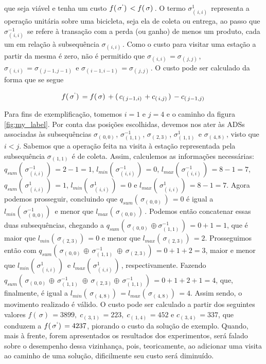 que seja viável e tenha um custo $f(\,\sigma^\lq)\, < f(\,\sigma)\,$. O termo $\sigma_{(\,i,i)\,}^1$ representa a operação unitária sobre uma bicicleta, seja ela de coleta ou entrega, ao passo que $\sigma^{-1}_{(\,i, i)\,}$ se refere à transação com a perda (ou ganho) de menos um produto, cada um em relação à subsequência $\sigma_{(\,i,i)\,}$. Como o custo para visitar uma estação a partir da mesma é zero, não é permitido que $\sigma_{(\,i,i)\,}=\sigma_{(\,j, j)\,}$, $\sigma_{(\,i,i)\,}=\sigma_{(\,j-1, j-1)\,}$ e $\sigma_{(\,i-1,i-1)\,}=\sigma_{(\,j, j)\,}$. O custo pode ser calculado da forma que se segue

    \begin{gather}
        f(\,\sigma^\lq)\, = f(\,\sigma)\, + (\,c_{(\,j-1, i)\,}  + c_{(\,i, j)\,})\, - c_{(\,j-1, j)\,}
    \end{gather}
    
\par Para fins de exemplificação, tomemos $i=1$ e $j=4$ e o caminho da figura \ref{fig:my_label}. Por conta das posições escolhidas, devemos nos ater às ADSs associadas às subsequências $\sigma_{(\,0, 0)\,}$, $\sigma_{(\,1, 1)\,}^{-1}$, $\sigma_{(\,2, 3)\,}$, $\sigma_{(\,1, 1)\,}^1$ e $\sigma_{(\,4, 8)\,}$, visto que $i<j$. Sabemos que a operação feita na visita à estação representada pela subsequência $\sigma_{(\,1, 1)\,}$ é de coleta. Assim, calculemos as informações necessárias: $q_{sum}(\,\sigma_{(\,i, i)\,}^{-1})\, = 2 - 1 = 1$, $l_{min}(\,\sigma_{(\,i, i)\,}^{-1})\, = 0$, $l_{max}(\,\sigma_{(\,i, i)\,}^{-1})\, = 8 - 1 = 7$, $q_{sum}(\,\sigma_{(\,i, i)\,}^{1})\, = 1$, $l_{min}(\,\sigma_{(\,i, i)\,}^{1})\, = 0$ e $l_{max}(\,\sigma_{(\,i, i)\,}^{1})\, = 8 - 1 = 7$. Agora podemos prosseguir, concluindo que $q_{sum}(\,\sigma_{(\,0, 0)}\,)\, = 0$ é igual a $l_{min}(\,\sigma_{(\,0, 0)}^{-1})\,$ e menor que $l_{max}(\,\sigma_{(\,0, 0)})\,$. Podemos então concatenar essas duas subsequências, chegando a $q_{sum}(\,\sigma_{(\,0, 0)\,} \oplus \sigma_{(\,1, 1)\,}^{-1})\, = 0 + 1 = 1$, que é maior que $l_{min}(\,\sigma_{(\,2, 3)})\, = 0$ e menor que $l_{max}(\,\sigma_{(\,2, 3)})\, = 2$. Prosseguimos então com $q_{sum}(\,\sigma_{(\,0, 0)\,} \oplus\, \sigma_{(\,1, 1)\,}^{-1}\, \oplus\, \sigma_{(\,2, 3)})\, = 0 + 1 + 2 = 3$, maior e menor que $l_{min}(\,\sigma_{(\,i, i)\,}^{1})\,$ e $l_{max}(\,\sigma_{(\,i, i)\,}^{1})\,$, respectivamente. Fazendo $q_{sum}(\,\sigma_{(\,0, 0)\,} \oplus\, \sigma_{(\,1, 1)\,}^{-1}\, \oplus\, \sigma_{(\,2, 3)} \oplus\, \sigma_{(\,1, 1)\,}^{-1})\, = 0 + 1 + 2 + 1 = 4$, que, finalmente, é igual a $l_{min}(\,\sigma_{(\,4, 8)})\, = l_{max}(\,\sigma_{(\,4, 8)})\, = 4$. Assim sendo, o movimento realizado é válido. O custo pode ser calculado a partir dos seguintes valores $f(\,\sigma)\, = 3899,\; c_{(\,3, 1)\,} = 223,\; c_{(\,1, 4)\,} = 452$ e $c_{(\,3, 4)\,} = 337$, que conduzem a $f(\,\sigma^\lq)\, = 4237$, piorando o custo da solução de exemplo. Quando, mais à frente, forem apresentados os resultados dos experimentos, será falado sobre o desempenho dessa vizinhança, pois, teoricamente, ao adicionar uma visita ao caminho de uma solução, dificilmente seu custo será diminuído.



